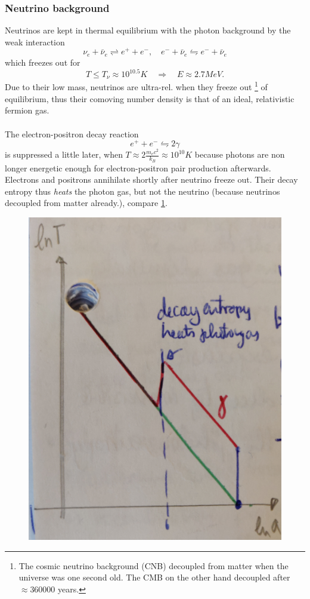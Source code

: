 \subsubsection{Neutrino background}
Neutrinos are kept in thermal equilibrium with the photon background by the weak interaction
\begin{equation}
	\nu_e + \bar{\nu}_e \rightleftharpoons e^++e^-,\quad e^-+\bar{\nu}_e \leftrightharpoons e^- +\bar{\nu}_e
\end{equation}
which freezes out for
\begin{equation*}
	T\leq T_\nu \approx 10^{10.5} K \quad \Rightarrow\quad E\approx 2.7 MeV.
\end{equation*}
Due to their low mass, neutrinos are ultra-rel. when they freeze out \footnote{The cosmic neutrino background (CNB) decoupled from matter when the universe was one second old. The CMB on the other hand decoupled after $\approx 360000$ years.} of equilibrium, thus their comoving number density is that of an ideal, relativistic fermion gas.\\
\\
The electron-positron decay reaction
\begin{equation}
	e^+ + e^- \leftrightharpoons 2 \gamma
\end{equation}
is suppressed a little later, when $T \approx 2 \frac{m_e c^2}{k_B} \approx 10^10K$ because photons are non longer energetic enough for electron-positron pair production afterwards. \\
Electrons and positrons annihilate shortly after neutrino freeze out. Their decay entropy thus \emph{heats} the photon gas, but not the neutrino (because neutrinos decoupled from matter already.), compare \ref{fig:neutrinophotontemperature}.
\begin{figure}[h!]
	\centering
	\includegraphics[width=0.5\linewidth]{gfx/neutrinoPhotonTemperature}
	\caption{}
	\label{fig:neutrinophotontemperature}
\end{figure}

